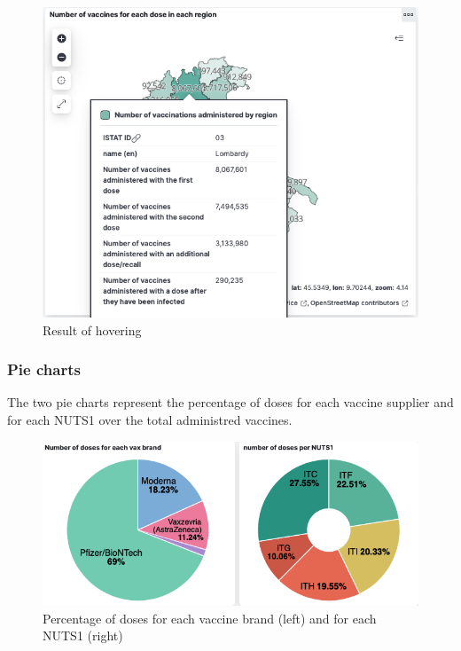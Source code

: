 \documentclass[12pt, a4paper]{article}
\begin{document}
\begin{figure}[H]
  \centering
  \includegraphics[width=.8\linewidth]{img (5).png}
  \caption*{Result of hovering}
\end{figure}

\subsubsection{Pie charts}
The two pie charts represent the percentage of doses for each vaccine supplier and for 
each NUTS1 over the total administred vaccines.
\begin{figure}[H]
  \centering
  \includegraphics[width=1\linewidth]{img (7).png}
  \caption*{Percentage of doses for each vaccine brand  (left) and for each NUTS1 (right)}
\end{figure}
\end{document}
